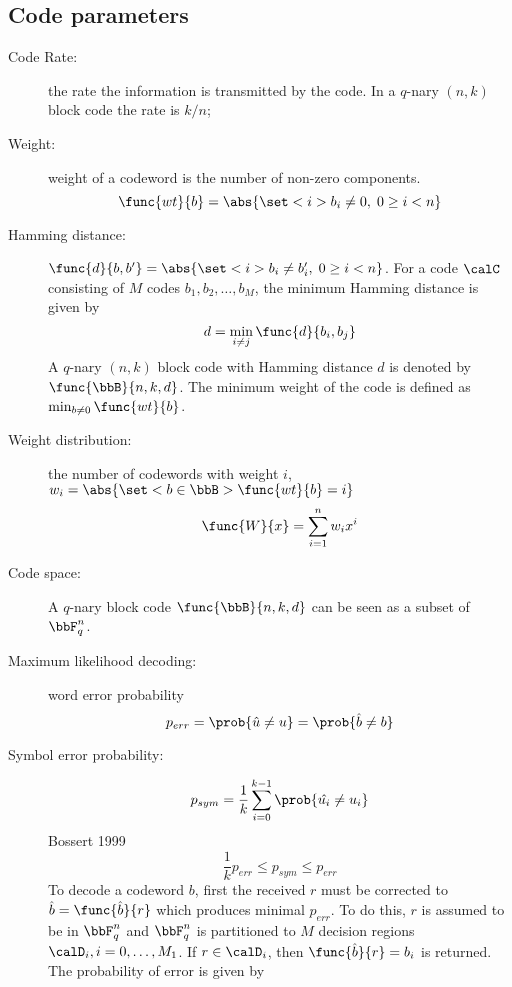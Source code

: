 \subsection{Code parameters}
\begin{description}
    \item[Code Rate:] the rate the information is transmitted by the code. In a \(q\)-nary \((n,k)\) block code the rate is \(k/n\);
    \item[Weight:] weight of a codeword is the number of non-zero components. 
    \begin{equation*}
        \func{wt}{b} = \abs{\set<i>{b_i \neq 0,\; 0 \geq i < n}}
    \end{equation*}
    \item[Hamming distance:] \(\func{d}{b,b'} = \abs{\set<i>{b_i \neq b_i',\; 0 \geq i < n}}\). For a code \(\calC\) consisting of \(M\) codes \(b_1, b_2, \dots, b_M\), the minimum Hamming distance is given by 
    \begin{equation*}
        d = \min_{i \neq j} \func{d}{b_i,b_j}
    \end{equation*}
    A \(q\)-nary \((n,k)\) block code with Hamming distance \(d\) is denoted by \(\func{\bbB}{n,k,d}\). The minimum weight of the code is defined as \(\min_{b \neq 0} \func{wt}{b}\).
    \item[Weight distribution:]  the number of codewords with weight \(i\), \(w_i = \abs{\set<b \in \bbB>{\func{wt}{b} = i}}\) 
    \begin{equation*}
        \func{W}{x} = \sum_{i = 1}^n w_i x^i
    \end{equation*}
    \item[Code space:] A \(q\)-nary block code \(\func{\bbB}{n,k,d}\) can be seen as a subset of \(\bbF^n_q\). 
    \item[Maximum likelihood decoding:] word error probability
    \begin{equation*}
        p_{err} = \prob{\hat{u} \neq u} = \prob{\hat{b} \neq b}
    \end{equation*}
    \item[Symbol error probability:]
    \begin{equation*}
        p_{sym} = \dfrac{1}{k} \sum_{i = 0}^{k-1} \prob{\hat{u_i} \neq u_i}
    \end{equation*}  
    Bossert 1999
    \begin{equation*}
        \dfrac{1}{k} p_{err} \leq p_{sym} \leq p_{err}
    \end{equation*}
    To decode a codeword \(b\), first the received \(r\) must be corrected to \(\hat{b} = \func{\hat{b}}{r}\) which produces minimal \(p_{err}\). To do this, \(r\) is assumed to be in \(\bbF_q^n\) and \(\bbF_q^n\) is partitioned to \(M\) decision regions \(\calD_i, i = 0, \dots , M_1\). If \(r \in \calD_i\), then \(\func{\hat{b}}{r} = b_i\) is returned. The probability of error is given by 

\end{description}
